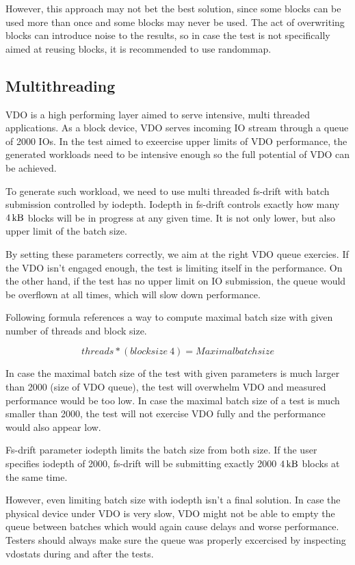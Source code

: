 \documentclass[
  color, %
  table, %
  lof,   %
  lot,   %
]{fithesis3}
\begin{document}
However, this approach may not bet the best solution, since some blocks can be used more than once and some blocks may never be used. The act of overwriting blocks can introduce noise to the results, so in case the test is not specifically aimed at reusing blocks, it is recommended to use randommap.

\subsection{Multithreading}
VDO is a high performing layer aimed to serve intensive, multi threaded applications. As a block device, VDO serves incoming IO stream through a queue of 2000 IOs. In the test aimed to exeercise upper limits of VDO performance, the generated workloads need to be intensive enough so the full potential of VDO can be achieved.

To generate such workload, we need to use multi threaded fs-drift with batch submission controlled by iodepth. Iodepth in fs-drift controls exactly how many $\SI{4}{\kilo\byte}$ blocks will be in progress at any given time. It is not only lower, but also upper limit of the batch size.

By setting these parameters correctly, we aim at the right VDO queue exercies. If the VDO isn't engaged enough, the test is limiting itself in the performance. On the other hand, if the test has no upper limit on IO submission, the queue would be overflown at all times, which will slow down performance.

Following formula references a way to compute maximal batch size with given number of threads and block size.

\[ threads * (blocksize \ 4) = Maximal batch size \]

In case the maximal batch size of the test with given parameters is much larger than 2000 (size of VDO queue), the test will overwhelm VDO and measured performance would be too low. In case the maximal batch size of a test is much smaller than 2000, the test will not exercise VDO fully and the performance would also appear low.

Fs-drift parameter iodepth limits the batch size from both size. If the user specifies iodepth of 2000, fs-drift will be submitting exactly 2000 $\SI{4}{\kilo\byte}$ blocks at the same time.

However, even limiting batch size with iodepth isn't a final solution. In case the physical device under VDO is very slow, VDO might not be able to empty the queue between batches which would again cause delays and worse performance. Testers should always make sure the queue was properly excercised by inspecting vdostats during and after the tests.
\end{document}
